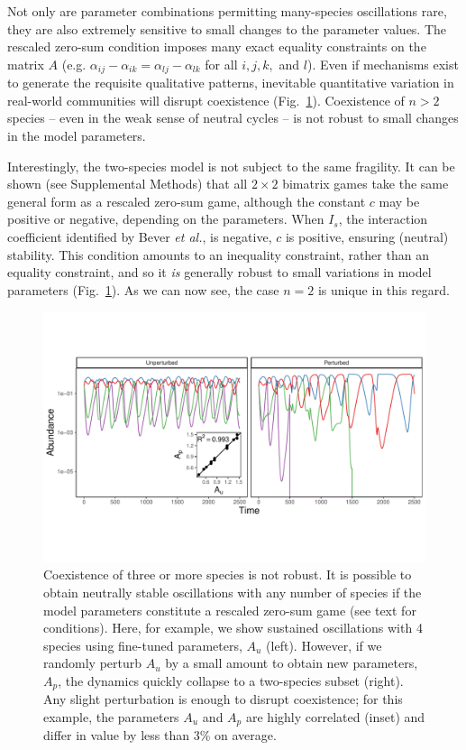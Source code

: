 \documentclass[11pt]{article}
\begin{document}
Not only are parameter combinations permitting many-species oscillations rare, they are also extremely sensitive to small changes to the parameter values. The rescaled zero-sum condition imposes many exact equality constraints on the matrix $A$ (e.g. $\alpha_{ij} - \alpha_{ik} = \alpha_{lj} - \alpha_{lk}$ for all $i, j, k,$ and $l$). Even if mechanisms exist to generate the requisite qualitative patterns, inevitable quantitative variation in real-world communities will disrupt coexistence (Fig.~\ref{fig:fragile}). Coexistence of $n > 2$ species -- even in the weak sense of neutral cycles -- is not robust to small changes in the model parameters.

Interestingly, the two-species model is not subject to the same fragility. It can be shown (see Supplemental Methods) that all $2 \times 2$ bimatrix games take the same general form as a rescaled zero-sum game, although the constant $c$ may be positive or negative, depending on the parameters. When $I_s$, the interaction coefficient identified by Bever \textit{et al.}, is negative, $c$ is positive, ensuring (neutral) stability. This condition amounts to an inequality constraint, rather than an equality constraint, and so it \emph{is} generally robust to small variations in model parameters (Fig.~\ref{fig:fragile}). As we can now see, the case $n = 2$ is unique in this regard. 

\begin{figure}
	\centering
	\includegraphics[width=\textwidth]{figure_3.pdf}
	\caption[Coexistence of three or more species is not robust]{Coexistence of three or more species is not robust. It is possible to obtain neutrally stable oscillations with any number of species if the model parameters constitute a rescaled zero-sum game (see text for conditions). Here, for example, we show sustained oscillations with 4 species using fine-tuned parameters, $A_u$ (left). However, if we randomly perturb $A_u$ by a small amount to obtain new parameters, $A_p$, the dynamics quickly collapse to a two-species subset (right). Any slight perturbation is enough to disrupt coexistence; for this example, the parameters $A_u$ and $A_p$ are highly correlated (inset) and differ in value by less than 3\% on average.}
	\label{fig:fragile}
\end{figure}
\end{document}
